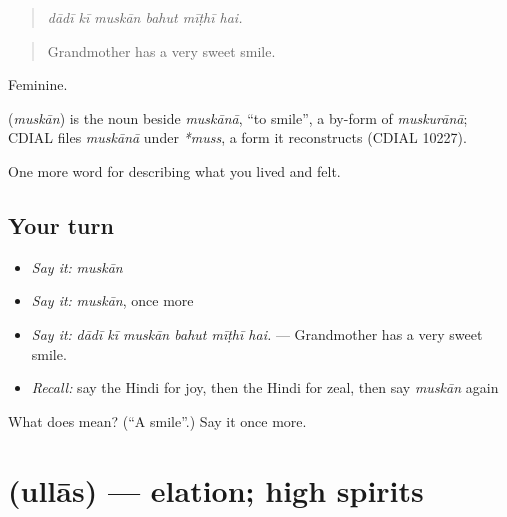 \begin{quote}
     
\end{quote}

\begin{quote}
\emph{dādī kī muskān bahut mīṭhī hai.}
\end{quote}

\begin{quote}
Grandmother has a very sweet smile.
\end{quote}

Feminine.

\begin{cousinweb}
\textbf{} (\emph{muskān}) is the noun beside \emph{muskānā}, \textquotedblleft{}to smile\textquotedblright{}, a by-form of \emph{muskurānā}; CDIAL files \emph{muskānā} under \emph{*muss}, a form it reconstructs (CDIAL 10227).
\end{cousinweb}

\begin{grammarlens}[title={What you've built}]
One more word for describing what you lived and felt.
\end{grammarlens}

\subsection*{Your turn}
\begin{itemize}
\raggedright
  \item \emph{Say it:} \emph{muskān}
  \item \emph{Say it:} \emph{muskān}, once more
  \item \emph{Say it:} \emph{dādī kī muskān bahut mīṭhī hai.} — Grandmother has a very sweet smile.
  \item \emph{Recall:} say the Hindi for joy, then the Hindi for zeal, then say \emph{muskān} again
\end{itemize}

\begin{tcolorbox}[breakable,colback=teal!4,colframe=teal!35!black,title={Before you move on}]
What does  mean? (\textquotedblleft{}A smile\textquotedblright{}.) Say it once more.
\end{tcolorbox}
\section[\texorpdfstring{\hi{उल्लास} (ullās)}{उल्लास (ullās)}]{ (ullās) — elation; high spirits}

